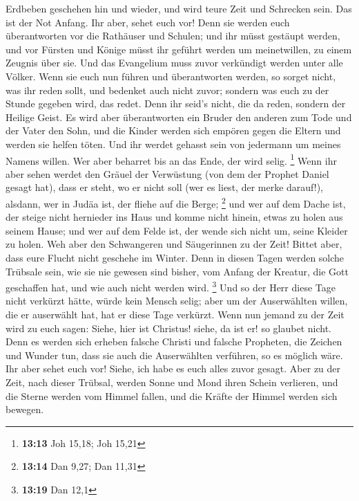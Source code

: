 Erdbeben geschehen hin und wieder, und wird teure Zeit und Schrecken
sein. Das ist der Not Anfang.  Ihr aber, sehet euch vor!
Denn sie werden euch überantworten vor die Rathäuser und Schulen; und
ihr müsst gestäupt werden, und vor Fürsten und Könige müsst ihr geführt
werden um meinetwillen, zu einem Zeugnis über sie.  Und
das Evangelium muss zuvor verkündigt werden unter alle Völker.
 Wenn sie euch nun führen und überantworten werden, so
sorget nicht, was ihr reden sollt, und bedenket auch nicht zuvor;
sondern was euch zu der Stunde gegeben wird, das redet. Denn ihr seid's
nicht, die da reden, sondern der Heilige Geist.  Es wird
aber überantworten ein Bruder den anderen zum Tode und der Vater den
Sohn, und die Kinder werden sich empören gegen die Eltern und werden sie
helfen töten.  Und ihr werdet gehasst sein von jedermann
um meines Namens willen. Wer aber beharret bis an das Ende, der wird
selig. \footnote{\textbf{13:13} Joh 15,18; Joh 15,21} 
Wenn ihr aber sehen werdet den Gräuel der Verwüstung (von dem der
Prophet Daniel gesagt hat), dass er steht, wo er nicht soll (wer es
liest, der merke darauf!), alsdann, wer in Judäa ist, der fliehe auf die
Berge; \footnote{\textbf{13:14} Dan 9,27; Dan 11,31}  und
wer auf dem Dache ist, der steige nicht hernieder ins Haus und komme
nicht hinein, etwas zu holen aus seinem Hause;  und wer
auf dem Felde ist, der wende sich nicht um, seine Kleider zu holen.
 Weh aber den Schwangeren und Säugerinnen zu der Zeit!
 Bittet aber, dass eure Flucht nicht geschehe im Winter.
 Denn in diesen Tagen werden solche Trübsale sein, wie
sie nie gewesen sind bisher, vom Anfang der Kreatur, die Gott geschaffen
hat, und wie auch nicht werden wird. \footnote{\textbf{13:19} Dan 12,1}
 Und so der Herr diese Tage nicht verkürzt hätte, würde
kein Mensch selig; aber um der Auserwählten willen, die er auserwählt
hat, hat er diese Tage verkürzt.  Wenn nun jemand zu der
Zeit wird zu euch sagen: Siehe, hier ist Christus! siehe, da ist er! so
glaubet nicht.  Denn es werden sich erheben falsche
Christi und falsche Propheten, die Zeichen und Wunder tun, dass sie auch
die Auserwählten verführen, so es möglich wäre.  Ihr aber
sehet euch vor! Siehe, ich habe es euch alles zuvor gesagt.
 Aber zu der Zeit, nach dieser Trübsal, werden Sonne und
Mond ihren Schein verlieren,  und die Sterne werden vom
Himmel fallen, und die Kräfte der Himmel werden sich bewegen.
